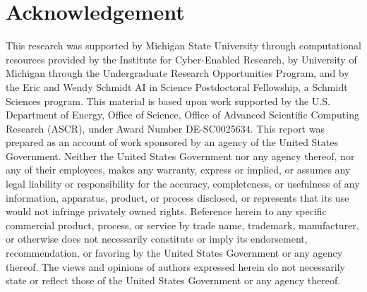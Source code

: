 \section*{Acknowledgement}

This research was supported by Michigan State University through computational resources provided by the Institute for Cyber-Enabled Research, by University of Michigan through the Undergraduate Research Opportunities Program, and by the Eric and Wendy Schmidt AI in Science Postdoctoral Fellowship, a Schmidt Sciences program.
This material is based upon work supported by the U.S. Department of Energy, Office of Science, Office of Advanced Scientific Computing Research (ASCR), under Award Number DE-SC0025634.
This report was prepared as an account of work sponsored by an agency of the United States Government.
Neither the United States Government nor any agency thereof, nor any of their employees, makes any warranty, express or implied, or assumes any legal liability or responsibility for the accuracy, completeness, or usefulness of any information, apparatus, product, or process disclosed, or represents that its use would not infringe privately owned rights.
Reference herein to any specific commercial product, process, or service by trade name, trademark, manufacturer, or otherwise does not necessarily constitute or imply its endorsement, recommendation, or favoring by the United States Government or any agency thereof.
The views and opinions of authors expressed herein do not necessarily state or reflect those of the United States Government or any agency thereof.
